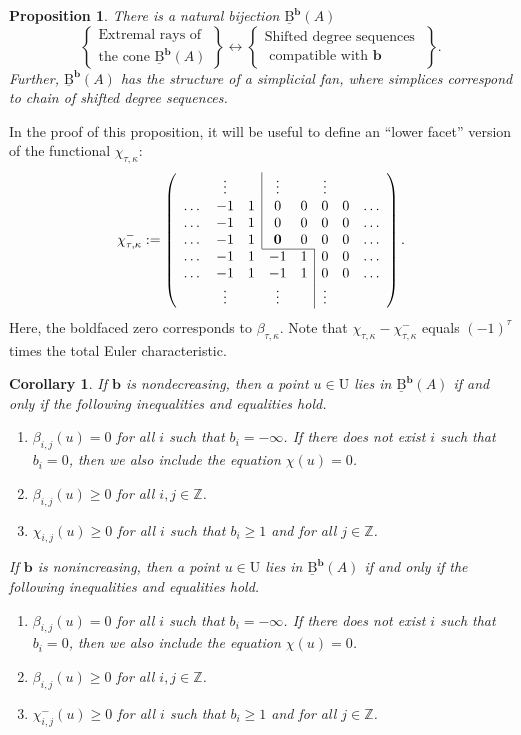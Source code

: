 \documentclass[12pt]{amsart}
\newtheorem{prop}[lemma]{Proposition}
\newtheorem{cor}[lemma]{Corollary}
\theoremstyle{definition}
\theoremstyle{remark}
\newcommand{\ZZ}{\mathbb{Z}}
\newcommand{\UU}{\mathrm{U}}
\newcommand{\bb}{\mathbf{b}}
\newcommand{\BBQ}{\underline{\mathrm{B}}}
\begin{document}
\begin{prop}\label{prop:conePP0 refined}
There is a natural bijection $\BBQ^{\bb}(A)$
\[
\left\{
\begin{matrix}
\text{Extremal rays of }\\
\text{the cone } \BBQ^{\bb}(A)
\end{matrix}
\right\}
\longleftrightarrow
\left\{
\begin{matrix}
\text{Shifted degree sequences }\\
\text{ compatible with $\bb$}
\end{matrix}
\right\}.
\]
Further, $\BBQ^{\bb}(A)$ has the structure of a simplicial fan, where simplices correspond to chain of shifted degree sequences.  
\end{prop}
In the proof of this proposition, it will be useful to define an ``lower facet'' version of the functional $\chi_{\tau,\kappa}$:
\[
\chi^{-}_{\tau,\kappa}:=
\left(
\begin{array}{cccccccc}
 & \vdots& &\multicolumn{1}{|c}{\vdots}&& \vdots&&\\
\dots&-1&1&\multicolumn{1}{|c}{0}&0&0&0&\dots\\
\dots&-1&1&\multicolumn{1}{|c}{0}&0&0&0&\dots\\
\dots&-1&1&\multicolumn{1}{|c}{\mathbf{0}}&0&0&0&\dots\\ \cline{4-5}
\dots&-1&1&-1&1&\multicolumn{1}{|c}{0}&0&\dots\\
\dots&-1&1&-1&1&\multicolumn{1}{|c}{0}&0&\dots\\
& \vdots&&\vdots&& \multicolumn{1}{|c}{\vdots}&&\\
\end{array}
\right).
\]
Here, the boldfaced zero corresponds to $\beta_{\tau,\kappa}$.  Note that $\chi_{\tau,\kappa}-\chi_{\tau,\kappa}^{-}$ equals $(-1)^{\tau}$ times the total Euler characteristic.
\begin{cor}\label{cor:dualconeA refined}
If $\bb$ is nondecreasing, then a point $u\in \UU$ lies in $\BBQ^{\bb}(A)$ if and only if the following inequalities and equalities hold.
\begin{enumerate}
	\item $\beta_{i,j}(u)=0$ for all $i$ such that $b_i=-\infty$.  If there does not exist $i$ such that $b_i=0$, then we also include the equation $\chi(u)=0$.
	\item $\beta_{i,j}(u)\geq 0$ for all $i,j\in \ZZ$.
	\item  $\chi_{i,j}(u)\geq 0$ for all $i$ such that $b_i\geq 1$ and for all $j\in \ZZ$.
\end{enumerate}
If $\bb$ is nonincreasing, then a point $u\in \UU$ lies in $\BBQ^{\bb}(A)$ if and only if the following inequalities and equalities hold.
\begin{enumerate}
	\item $\beta_{i,j}(u)=0$ for all $i$ such that $b_i=-\infty$.  If there does not exist $i$ such that $b_i=0$, then we also include the equation $\chi(u)=0$.
	\item $\beta_{i,j}(u)\geq 0$ for all $i,j\in \ZZ$.
	\item  $\chi^{-}_{i,j}(u)\geq 0$ for all $i$ such that $b_i\geq 1$ and for all $j\in \ZZ$.
\end{enumerate}
\end{cor}
\end{document}
